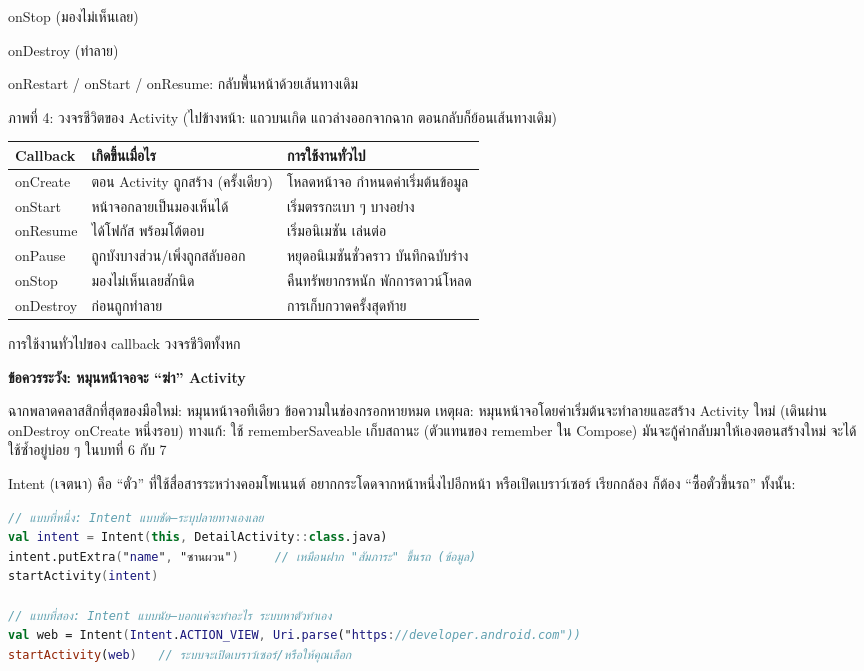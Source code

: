 onStop (มองไม่เห็นเลย)

onDestroy (ทำลาย)

onRestart / onStart / onResume: กลับพื้นหน้าด้วยเส้นทางเดิม

\begin{center}\small\color{gray}ภาพที่ 4: วงจรชีวิตของ Activity (ไปข้างหน้า: แถวบนเกิด แถวล่างออกจากฉาก ตอนกลับก็ย้อนเส้นทางเดิม)\end{center}

\begin{center}
\begin{tabularx}{\linewidth}{|X|X|X|}
\hline
\textbf{Callback} & \textbf{เกิดขึ้นเมื่อไร} & \textbf{การใช้งานทั่วไป} \tabularnewline
\hline
onCreate & ตอน Activity ถูกสร้าง (ครั้งเดียว) & โหลดหน้าจอ กำหนดค่าเริ่มต้นข้อมูล \tabularnewline
onStart & หน้าจอกลายเป็นมองเห็นได้ & เริ่มตรรกะเบา ๆ บางอย่าง \tabularnewline
onResume & ได้โฟกัส พร้อมโต้ตอบ & เริ่มอนิเมชัน เล่นต่อ \tabularnewline
onPause & ถูกบังบางส่วน/เพิ่งถูกสลับออก & หยุดอนิเมชันชั่วคราว บันทึกฉบับร่าง \tabularnewline
onStop & มองไม่เห็นเลยสักนิด & คืนทรัพยากรหนัก พักการดาวน์โหลด \tabularnewline
onDestroy & ก่อนถูกทำลาย & การเก็บกวาดครั้งสุดท้าย \tabularnewline
\hline
\end{tabularx}
\end{center}

\begin{center}\small\color{gray}การใช้งานทั่วไปของ callback วงจรชีวิตทั้งหก\end{center}

\textbf{ข้อควรระวัง: หมุนหน้าจอจะ “ฆ่า” Activity}\par

ฉากพลาดคลาสสิกที่สุดของมือใหม่: หมุนหน้าจอทีเดียว ข้อความในช่องกรอกหายหมด เหตุผล: หมุนหน้าจอโดยค่าเริ่มต้นจะทำลายและสร้าง Activity ใหม่ (เดินผ่าน onDestroy onCreate หนึ่งรอบ) ทางแก้: ใช้ rememberSaveable เก็บสถานะ (ตัวแทนของ remember ใน Compose) มันจะกู้ค่ากลับมาให้เองตอนสร้างใหม่ จะได้ใช้ซ้ำอยู่บ่อย ๆ ในบทที่ 6 กับ 7


Intent (เจตนา) คือ “ตั๋ว” ที่ใช้สื่อสารระหว่างคอมโพเนนต์ อยากกระโดดจากหน้าหนึ่งไปอีกหน้า หรือเปิดเบราว์เซอร์ เรียกกล้อง ก็ต้อง “ซื้อตั๋วขึ้นรถ” ทั้งนั้น:

\begin{lstlisting}[language=Kotlin]
// แบบที่หนึ่ง: Intent แบบชัด—ระบุปลายทางเองเลย
val intent = Intent(this, DetailActivity::class.java)
intent.putExtra("name", "ซานผวน")     // เหมือนฝาก "สัมภาระ" ขึ้นรถ (ข้อมูล)
startActivity(intent)

// แบบที่สอง: Intent แบบนัย—บอกแค่จะทำอะไร ระบบหาตัวทำเอง
val web = Intent(Intent.ACTION_VIEW, Uri.parse("https://developer.android.com"))
startActivity(web)   // ระบบจะเปิดเบราว์เซอร์/หรือให้คุณเลือก
\end{lstlisting}


